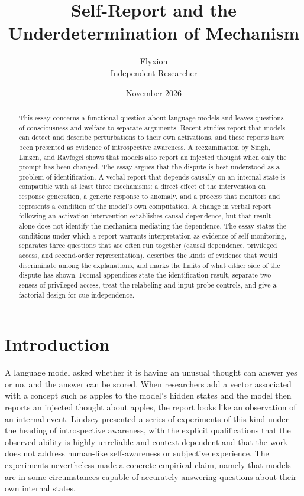 \documentclass[11pt]{article}
\title{Self-Report and the Underdetermination of Mechanism}
\author{Flyxion\\Independent Researcher}
\date{November 2026}
\theoremstyle{definition}
\theoremstyle{remark}
\begin{document}
\maketitle

\begin{abstract}
This essay concerns a functional question about language models and leaves questions of consciousness and welfare to separate arguments. Recent studies report that models can detect and describe perturbations to their own activations, and these reports have been presented as evidence of introspective awareness. A reexamination by Singh, Linzen, and Ravfogel shows that models also report an injected thought when only the prompt has been changed. The essay argues that the dispute is best understood as a problem of identification. A verbal report that depends causally on an internal state is compatible with at least three mechanisms: a direct effect of the intervention on response generation, a generic response to anomaly, and a process that monitors and represents a condition of the model's own computation. A change in verbal report following an activation intervention establishes causal dependence, but that result alone does not identify the mechanism mediating the dependence. The essay states the conditions under which a report warrants interpretation as evidence of self-monitoring, separates three questions that are often run together (causal dependence, privileged access, and second-order representation), describes the kinds of evidence that would discriminate among the explanations, and marks the limits of what either side of the dispute has shown. Formal appendices state the identification result, separate two senses of privileged access, treat the relabeling and input-probe controls, and give a factorial design for cue-independence.
\end{abstract}

\section{Introduction}

A language model asked whether it is having an unusual thought can answer yes or no, and the answer can be scored. When researchers add a vector associated with a concept such as apples to the model's hidden states and the model then reports an injected thought about apples, the report looks like an observation of an internal event. Lindsey \citeyearpar{lindsey2025} presented a series of experiments of this kind under the heading of introspective awareness, with the explicit qualifications that the observed ability is highly unreliable and context-dependent and that the work does not address human-like self-awareness or subjective experience. The experiments nevertheless made a concrete empirical claim, namely that models are in some circumstances capable of accurately answering questions about their own internal states.
\end{document}
